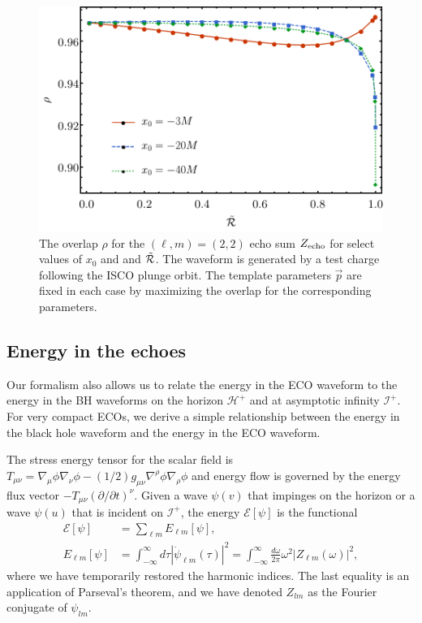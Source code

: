 \begin{refsection}
\begin{figure}[t]
\includegraphics[width = 1 \columnwidth]{chapter_echo/etc/AllEchosrho}
\caption{ The overlap $\rho$ for the $(\ell,m) =(2,2)$ echo sum $Z_{\rm echo}$ for select values of $x_0$ and and $\tilde{\mathcal R}$. The waveform is generated by a test charge following the ISCO plunge orbit. The template parameters $\vec p$ are fixed in each case by maximizing the overlap for the corresponding parameters.
}
\label{fig:rho2Allecho}
\end{figure}

\subsection{Energy in the echoes}

Our formalism also allows us to relate the energy in the ECO waveform to the energy in the BH waveforms on the horizon $\mathcal{H}^+$ and at asymptotic infinity $\mathcal{I}^+$. For very compact ECOs, we derive a simple relationship between the energy in the black hole waveform and the energy in the ECO waveform.

The stress energy tensor for the scalar field is $T_{\mu\nu}=\nabla_\mu \phi\nabla_\nu \phi-(1/2) g_{\mu \nu}\nabla^\rho\phi\nabla_\rho\phi$ and energy flow is governed by the energy flux vector $-T_{\mu\nu}(\partial/\partial t)^\nu$. 
Given a wave $\psi(v)$ that impinges on the horizon or a wave $\psi(u)$ that is incident on $\mathcal{I}^+$, the energy $\mathcal{E}[\psi]$ is the functional
\begin{align}
\mathcal{E}[\psi]&=\sum_{\ell m} E_{\ell m}[\psi], \\
E_{\ell m}[\psi]&=\int_{-\infty}^\infty d\tau |\dot\psi_{\ell m}(\tau)|^2 
=\int_{-\infty}^\infty \frac{d\omega}{2\pi} \omega^2|Z_{\ell m}(\omega)|^2,
\end{align}
where we have temporarily restored the harmonic indices. The last equality is an application of Parseval's theorem, and we have denoted $Z_{lm}$ as the Fourier conjugate of $\psi_{lm}$. 


\end{refsection}
